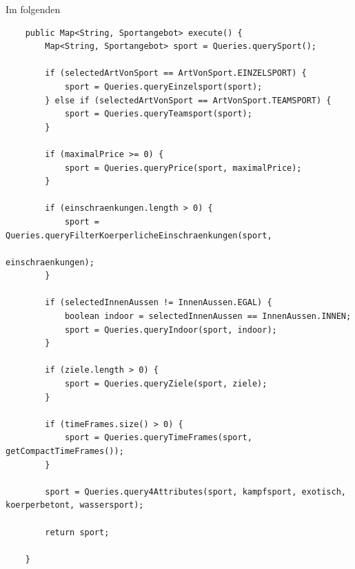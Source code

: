 Im folgenden 

		


\begin{lstlisting}
    public Map<String, Sportangebot> execute() {
        Map<String, Sportangebot> sport = Queries.querySport();

        if (selectedArtVonSport == ArtVonSport.EINZELSPORT) {
            sport = Queries.queryEinzelsport(sport);
        } else if (selectedArtVonSport == ArtVonSport.TEAMSPORT) {
            sport = Queries.queryTeamsport(sport);
        }

        if (maximalPrice >= 0) {
            sport = Queries.queryPrice(sport, maximalPrice);
        }

        if (einschraenkungen.length > 0) {
            sport = Queries.queryFilterKoerperlicheEinschraenkungen(sport,
                                                                   einschraenkungen);
        }

        if (selectedInnenAussen != InnenAussen.EGAL) {
            boolean indoor = selectedInnenAussen == InnenAussen.INNEN;
            sport = Queries.queryIndoor(sport, indoor);
        }

        if (ziele.length > 0) {
            sport = Queries.queryZiele(sport, ziele);
        }

        if (timeFrames.size() > 0) {
            sport = Queries.queryTimeFrames(sport, getCompactTimeFrames());
        }

        sport = Queries.query4Attributes(sport, kampfsport, exotisch, koerperbetont, wassersport);

        return sport;

    }

\end{lstlisting}


